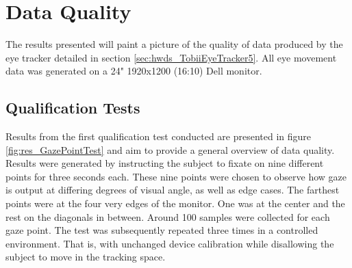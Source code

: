 \section{Data Quality} \label{sec:res_DataQuality}


The results presented will paint a picture of the quality of data produced by the eye tracker detailed in section \ref{sec:hwds_TobiiEyeTracker5}. All eye movement data was generated on a 24" 1920x1200 (16:10) Dell monitor.

\subsection{Qualification Tests}

Results from the first qualification test conducted are presented in figure \ref{fig:res_GazePointTest} and aim to provide a general overview of data quality. Results were generated by instructing the subject to fixate on nine different points for three seconds each. These nine points were chosen to observe how gaze is output at differing degrees of visual angle, as well as edge cases. The farthest points were at the four very edges of the monitor. One was at the center and the rest on the diagonals in between. Around 100 samples were collected for each gaze point. The test was subsequently repeated three times in a controlled environment. That is, with unchanged device calibration while disallowing the subject to move in the tracking space.

